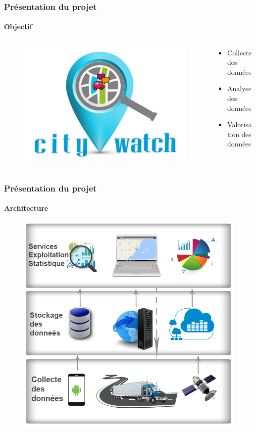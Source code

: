 \documentclass{beamer}
\begin{document}
\begin{frame}
    \frametitle{Présentation du projet}
    \framesubtitle{Objectif}
    \begin{columns}
        \begin{column}{0.5\textwidth}
            \begin{figure}
                \includegraphics[width=1\textwidth]{figures/logo-citywatch.jpg}
            \end{figure}
        \end{column}
        \begin{column}{0.5\textwidth}
            \begin{itemize}
                \item<1-> Collecte des données
                \item<2-> Analyse des données
                \item<3-> Valorisation des données
            \end{itemize}
        \end{column}
    \end{columns}
\end{frame}

\begin{frame}
    \frametitle{Présentation du projet}
    \framesubtitle{Architecture}
    \begin{figure}
        \centering
    \includegraphics[width=.63\textwidth]{figures/citywatch-modules.png}
\end{figure}
\end{frame}
\end{document}
